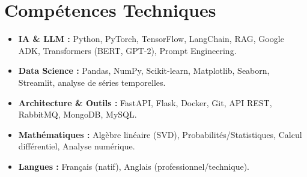 \documentclass[a4paper,11pt]{article}
\begin{document}
\section{Compétences Techniques}
\begin{itemize}[leftmargin=*, nosep]
    \item \small{\textbf{IA \& LLM :} Python, PyTorch, TensorFlow, LangChain, RAG, Google ADK, Transformers (BERT, GPT-2), Prompt Engineering.}
    \item \small{\textbf{Data Science :} Pandas, NumPy, Scikit-learn, Matplotlib, Seaborn, Streamlit, analyse de séries temporelles.}
    \item \small{\textbf{Architecture \& Outils :} FastAPI, Flask, Docker, Git, API REST, RabbitMQ, MongoDB, MySQL.}
    \item \small{\textbf{Mathématiques :} Algèbre linéaire (SVD), Probabilités/Statistiques, Calcul différentiel, Analyse numérique.}
    \item \small{\textbf{Langues :} Français (natif), Anglais (professionnel/technique).}
\end{itemize}

\end{document}
